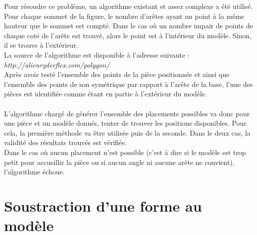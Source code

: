 \documentclass[a4paper, 11pt]{report}
\begin{document}
    Pour résoudre ce problème, un algorithme existant et assez complexe a été utilisé. Pour chaque sommet de la figure, le nombre d'arêtes ayant un point à la même hauteur que le sommet est compté. Dans le cas où un nombre impair de points de chaque coté de l'arête est trouvé, alors le point est à l'intérieur du modèle. Sinon, il se trouve à l'extérieur.\\
    La source de l'algorithme est disponible à l'adresse suivante : \emph{http://alienryderflex.com/polygon/}\\ 

    Après avoir testé l'ensemble des points de la pièce positionnée et ainsi que l'ensemble des points de son symétrique par rapport à l'arête de la base, l'une des pièces est identifiée comme étant en partie à l'extérieur du modèle.\\ \ \\

    L'algorithme chargé de générer l'ensemble des placements possibles va donc pour une pièce et un modèle donnés, tenter de trouver les positions disponibles. Pour cela, la première méthode va être utilisée puis de la seconde. Dans le deux cas, la validité des résultats trouvés est vérifiée.\\
    Dans le cas où aucun placement n'est possible (c'est à dire si le modèle est trop petit pour accueillir la pièce ou si aucun angle ni aucune arête ne convient), l'algorithme échoue.
	
		\section{Soustraction d'une forme au modèle}
		
\end{document}
